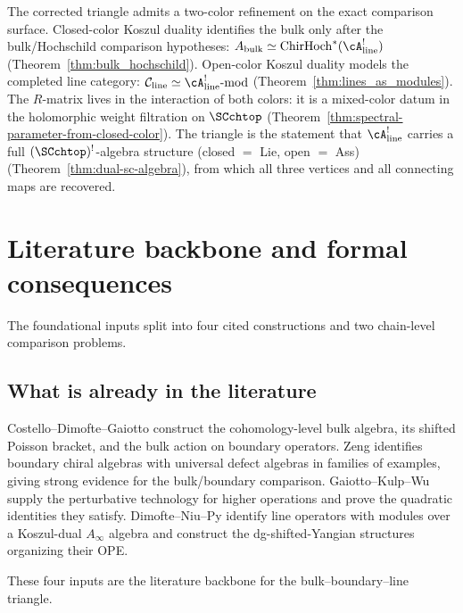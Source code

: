 \begin{remark}
The corrected triangle admits a two-color refinement on the exact
comparison surface. Closed-color Koszul duality identifies the bulk
only after the bulk/Hochschild comparison hypotheses:
$A_{\mathrm{bulk}} \simeq \mathrm{ChirHoch}^\ast(\cA^!_{\mathrm{line}})$
(Theorem~\ref{thm:bulk_hochschild}).
Open-color Koszul duality models the completed line category:
$\mathcal{C}_{\mathrm{line}} \simeq \cA^!_{\mathrm{line}}\text{-mod}$
(Theorem~\ref{thm:lines_as_modules}).
The $R$-matrix lives in the interaction of both colors:
it is a mixed-color datum in the holomorphic weight
filtration on $\SCchtop$ (Theorem~\ref{thm:spectral-parameter-from-closed-color}).
The triangle is the statement that $\cA^!_{\mathrm{line}}$ carries a full
$(\SCchtop)^{!}$-algebra structure (closed $=$ Lie, open $=$ Ass)
(Theorem~\ref{thm:dual-sc-algebra}), from which all three
vertices and all connecting maps are recovered.
\end{remark}

\section{Literature backbone and formal consequences}%

The foundational inputs split into four cited constructions and two
chain-level comparison problems.

\subsection{What is already in the literature}

Costello--Dimofte--Gaiotto \cite{CDG20} construct the cohomology-level bulk algebra, its shifted Poisson bracket, and the bulk action on boundary operators. Zeng \cite{Zeng23} identifies boundary chiral algebras with universal defect algebras in families of examples, giving strong evidence for the bulk/boundary comparison. Gaiotto--Kulp--Wu \cite{GKW25} supply the perturbative technology for higher operations and prove the quadratic identities they satisfy. Dimofte--Niu--Py \cite{DNP25} identify line operators with modules over a Koszul-dual $A_\infty$ algebra and construct the dg-shifted-Yangian structures organizing their OPE.

These four inputs are the literature backbone for the bulk--boundary--line
triangle.

